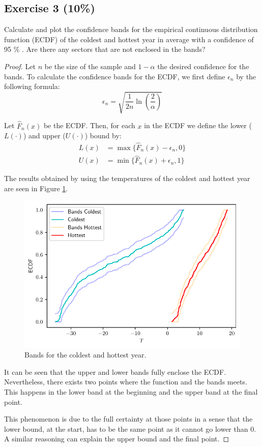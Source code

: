 \documentclass[11pt]{article}
\theoremstyle{definition}
\theoremstyle{remark}
\theoremstyle{remark}
\begin{document}
\subsection*{Exercise 3 (10\%)}
Calculate and plot the confidence bands for the empirical continuous
distribution function (ECDF) of the coldest and hottest year in
average with a confidence of 95 \% . Are there any sectors that are
not enclosed in the bands?

\begin{proof}
  Let $n$ be the size of the sample and $1 - \alpha$ the desired
  confidence for the bands. To calculate the confidence bands for the
  ECDF, we first define $\epsilon_n$ by the following formula:
  \begin{equation*}
    \epsilon_n = \sqrt{\frac{1}{2n} \ln\left(\frac{2}{\alpha}\right)}
  \end{equation*}

  Let $\hat{F}_n(x)$ be the ECDF. Then, for each $x$ in the ECDF we
  define the lower ($L(\cdot)$) and upper ($U(\cdot)$) bound by:
  \begin{align*}
    L(x) &= \max\{\hat{F}_n(x) - \epsilon_n, 0\} \\
    U(x) &= \min\{\hat{F}_n(x) + \epsilon_n, 1\}
  \end{align*}

  The results obtained by using the temperatures of the coldest and
  hottest year are seen in Figure \ref{fig:ex3}.
  \begin{figure}[H]
    \centering
    \includegraphics[scale=0.5]{../figs/ecdf_bands.pdf}
    \caption{Bands for the coldest and hottest year.}
    \label{fig:ex3}
  \end{figure}

  It can be seen that the upper and lower bands fully enclose the
  ECDF. Nevertheless, there exists two points where the function and
  the bands meets. This happens in the lower band at the beginning and
  the upper band at the final point.

  This phenomenon is due to the full certainty at those points in a
  sense that the lower bound, at the start, has to be the same point
  as it cannot go lower than 0. A similar reasoning can explain the
  upper bound and the final point.
\end{proof}
\end{document}

